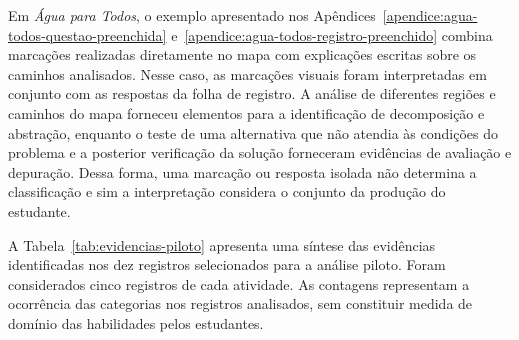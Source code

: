 Em \textit{Água para Todos}, o exemplo apresentado nos Apêndices~\ref{apendice:agua-todos-questao-preenchida} e~\ref{apendice:agua-todos-registro-preenchido} combina marcações realizadas diretamente no mapa com explicações escritas sobre os caminhos analisados. Nesse caso, as marcações visuais foram interpretadas em conjunto com as respostas da folha de registro. A análise de diferentes regiões e caminhos do mapa forneceu elementos para a identificação de decomposição e abstração, enquanto o teste de uma alternativa que não atendia às condições do problema e a posterior verificação da solução forneceram evidências de avaliação e depuração. Dessa forma, uma marcação ou resposta isolada não determina a classificação e sim a interpretação considera o conjunto da produção do estudante.

A Tabela~\ref{tab:evidencias-piloto} apresenta uma síntese das evidências identificadas nos dez registros selecionados para a análise piloto. Foram considerados cinco registros de cada atividade. As contagens representam a ocorrência das categorias nos registros analisados, sem constituir medida de domínio das habilidades pelos estudantes.

